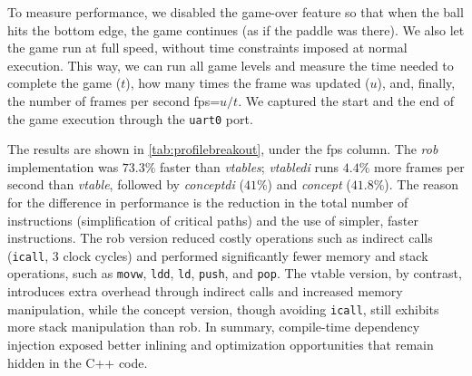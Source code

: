 \documentclass[10pt,sigplan,screen,anonymous]{acmart}
\newcommand{\blindreview}[1]{#1}
\begin{document}

To measure performance, we disabled the game-over feature so that when the ball hits the bottom edge, the game continues (as if the paddle was there). We also let the game run at full speed, without time constraints imposed at normal execution. This way, we can run all game levels and measure the time needed to complete the game ($t$), how many times the frame was updated ($u$), and, finally, the number of frames per second fps=$u/t$. We captured the start and the end of the game execution through the {\tt uart0} port. %


The results are shown in \autoref{tab:profilebreakout}, under the fps column. The \emph{rob} implementation was $73.3\%$ faster than \emph{vtables}; \emph{vtabledi} runs $4.4\%$ more frames per second than \emph{vtable}, followed by \emph{conceptdi} ($41\%$) and \emph{concept} ($41.8\%$). The reason for the difference in performance is the reduction in the total number of instructions (simplification of critical paths) and the use of simpler, faster instructions. The rob version reduced costly operations such as indirect calls ({\tt icall}, 3 clock cycles) and performed significantly fewer memory and stack operations, such as {\tt movw}, {\tt ldd}, {\tt ld}, {\tt push}, and {\tt pop}. The vtable version, by contrast, introduces extra overhead through indirect calls and increased memory manipulation, while the concept version, though avoiding {\tt icall}, still exhibits more stack manipulation than rob. In summary, compile-time dependency injection exposed better inlining and optimization opportunities that remain hidden in the C++ code.
\end{document}
